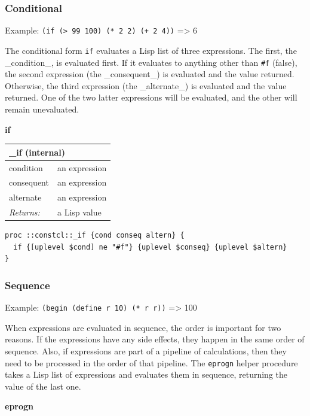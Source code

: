 \documentclass[twoside,9pt]{report}
\begin{document}
\subsubsection{Conditional}
\label{conditional}

Example: \texttt{(if (> 99 100) (* 2 2) (+ 2 4))} => 6


The conditional form \texttt{if} evaluates a Lisp list of three expressions. The first, the \_condition\_, is evaluated first. If it evaluates to anything other than \texttt{\#f} (false), the second expression (the \_consequent\_) is evaluated and the value returned. Otherwise, the third expression (the \_alternate\_) is evaluated and the value returned. One of the two latter expressions will be evaluated, and the other will remain unevaluated.


\textbf{if}

\begin{tabular}{ |l l| }
\hline
\multicolumn{2}{|l|}{\_if (internal)} \\
\hline
condition & an expression \\
consequent & an expression \\
alternate & an expression \\
\textit{Returns:} & a Lisp value \\
\hline
\end{tabular}

\noindent\makebox[\linewidth]{\rule{\linewidth}{0.4pt}}
\begin{lstlisting}
proc ::constcl::_if {cond conseq altern} {
  if {[uplevel $cond] ne "#f"} {uplevel $conseq} {uplevel $altern}
}
\end{lstlisting}
\noindent\makebox[\linewidth]{\rule{\linewidth}{0.4pt}}
\subsubsection{Sequence}
\label{sequence}

Example: \texttt{(begin (define r 10) (* r r))} => 100


When expressions are evaluated in sequence, the order is important for two reasons. If the expressions have any side effects, they happen in the same order of sequence. Also, if expressions are part of a pipeline of calculations, then they need to be processed in the order of that pipeline. The \texttt{eprogn} helper procedure takes a Lisp list of expressions and evaluates them in sequence, returning the value of the last one.


\textbf{eprogn}
\end{document}
